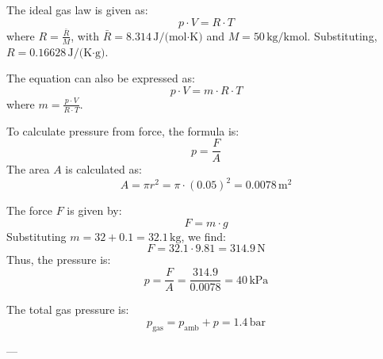 The ideal gas law is given as:  
\[
p \cdot V = R \cdot T
\]  
where \( R = \frac{\bar{R}}{M} \), with \( \bar{R} = 8.314 \, \text{J/(mol·K)} \) and \( M = 50 \, \text{kg/kmol} \). Substituting, \( R = 0.16628 \, \text{J/(K·g)} \).  

The equation can also be expressed as:  
\[
p \cdot V = m \cdot R \cdot T
\]  
where \( m = \frac{p \cdot V}{R \cdot T} \).  

To calculate pressure from force, the formula is:  
\[
p = \frac{F}{A}
\]  
The area \( A \) is calculated as:  
\[
A = \pi r^2 = \pi \cdot (0.05)^2 = 0.0078 \, \text{m}^2
\]  

The force \( F \) is given by:  
\[
F = m \cdot g
\]  
Substituting \( m = 32 + 0.1 = 32.1 \, \text{kg} \), we find:  
\[
F = 32.1 \cdot 9.81 = 314.9 \, \text{N}
\]  
Thus, the pressure is:  
\[
p = \frac{F}{A} = \frac{314.9}{0.0078} = 40 \, \text{kPa}
\]  

The total gas pressure is:  
\[
p_{\text{gas}} = p_{\text{amb}} + p = 1.4 \, \text{bar}
\]  

---